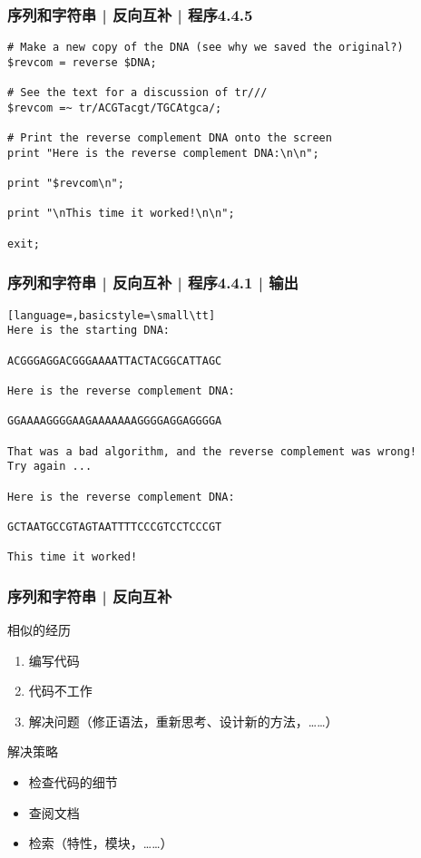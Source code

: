 \begin{frame}[fragile]
  \frametitle{序列和字符串 | 反向互补 | 程序4.4.5}
\begin{lstlisting}[firstnumber=60,basicstyle=\small\tt]
# Make a new copy of the DNA (see why we saved the original?)
$revcom = reverse $DNA;

# See the text for a discussion of tr///
$revcom =~ tr/ACGTacgt/TGCAtgca/;

# Print the reverse complement DNA onto the screen
print "Here is the reverse complement DNA:\n\n";

print "$revcom\n";

print "\nThis time it worked!\n\n";

exit;
\end{lstlisting}
\end{frame}

\begin{frame}[fragile]
  \frametitle{序列和字符串 | 反向互补 | 程序4.4.1 | 输出}
\begin{lstlisting}[language=,basicstyle=\small\tt]
Here is the starting DNA:

ACGGGAGGACGGGAAAATTACTACGGCATTAGC

Here is the reverse complement DNA:

GGAAAAGGGGAAGAAAAAAAGGGGAGGAGGGGA

That was a bad algorithm, and the reverse complement was wrong!
Try again ...

Here is the reverse complement DNA:

GCTAATGCCGTAGTAATTTTCCCGTCCTCCCGT

This time it worked!
\end{lstlisting}
\end{frame}

\begin{frame}
  \frametitle{序列和字符串 | 反向互补}
   \begin{block}{相似的经历}
     \begin{enumerate}
       \item 编写代码
       \item 代码不工作
       \item 解决问题（修正语法，重新思考、设计新的方法，……）
     \end{enumerate}
   \end{block} 
   \pause
   \begin{block}{解决策略}
     \begin{itemize}
       \item 检查代码的细节
       \item 查阅文档
       \item 检索（特性，模块，……）
     \end{itemize}
   \end{block}
\end{frame}

